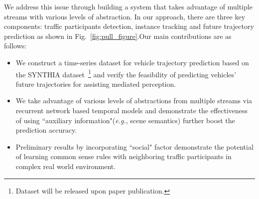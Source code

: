 \documentclass[10pt,twocolumn,letterpaper]{article}
\begin{document}
We address this issue through building a system that takes advantage of multiple streams with various levels of abstraction.
In our approach, there are three key components: traffic participants detection, instance tracking and future trajectory prediction as shown in Fig.~\ref{fig:pull_figure}.Our main contributions are as follows:
\begin{itemize}
\itemsep0em
\item We construct a time-series dataset for vehicle trajectory prediction based on the SYNTHIA dataset~\cite{ros2016synthia}\footnote{Dataset will be released upon paper publication.} and verify the feasibility of predicting vehicles' future trajectories for assisting mediated perception.

\item We take advantage of various levels of abstractions from multiple streams via recurrent network based temporal models and demonstrate the effectiveness of using ``auxiliary information"(\emph{e.g.}, scene semantics) further boost the prediction accuracy.
    
\item Preliminary results by incorporating ``social" factor demonstrate the potential of learning common sense rules with neighboring traffic participants in complex real world  environment.

\end{itemize}
%
%
%
%
%
%
%
\end{document}
